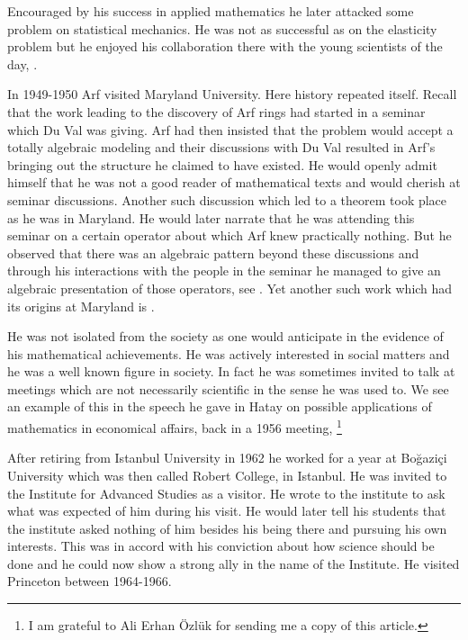 \documentclass[12pt]{amsart}
\begin{document}
Encouraged by his success in applied mathematics he later attacked some problem on statistical mechanics. He was not as successful as on the elasticity problem but he enjoyed his collaboration there with the young scientists of the day, \cite{carf21}.

In 1949-1950 Arf visited Maryland University. Here history repeated itself. Recall that the work leading to the discovery of Arf rings had started in a seminar which Du Val was giving. Arf had then insisted that the problem would accept a totally algebraic modeling and their discussions with Du Val resulted in Arf's bringing out the structure he claimed to have existed.
He would openly admit himself that he was not a good reader of mathematical texts and would cherish at seminar discussions. Another such discussion which led to a theorem took place as he was in Maryland. He would later narrate that he was attending this seminar on a certain operator about which Arf knew practically nothing. But he observed that there was an algebraic pattern beyond these discussions and through his interactions with the people in the seminar he managed to give an algebraic presentation of those operators, see \cite{carf11}. Yet another such work which had its origins at Maryland is \cite{carf15}.

He was not isolated from the society as one would anticipate in the evidence of his mathematical achievements. He was actively interested in social matters and he was a well known figure in society. In fact he was sometimes invited to talk at meetings which are not necessarily scientific in the sense he was used to. We see an example of this in the speech he gave in Hatay on possible applications of mathematics in economical affairs, back in a 1956 meeting, \cite{arf-hatay}\footnote{I am grateful to Ali Erhan \"{O}zl\"{u}k for sending me a copy of this article.}

After retiring from Istanbul University in 1962 he worked for a year at Bo\u{g}azi\c{c}i University which was then called Robert College, in Istanbul. He was invited to the Institute for Advanced Studies as a visitor. He wrote to the institute to ask what was expected of him during his visit. He would later tell his students that the institute asked nothing of him besides his being there and pursuing his own interests. This was in accord with his conviction about how science should be done and he could now show a strong ally in the name of the Institute. He visited Princeton between 1964-1966.
\end{document}
